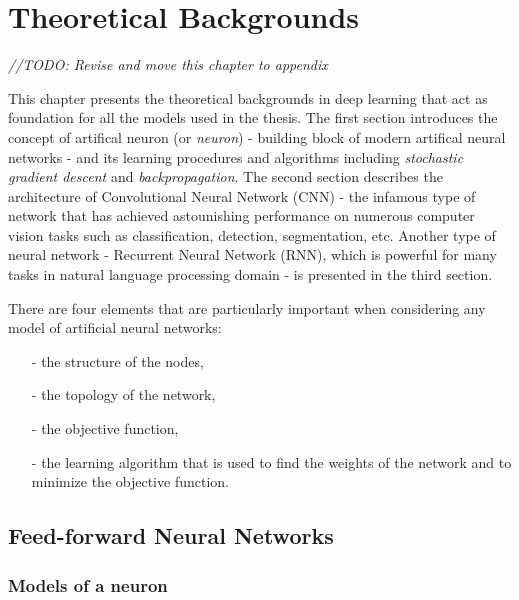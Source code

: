 \chapter{Theoretical Backgrounds}
\textit{//TODO: Revise and move this chapter to appendix}

\nocite{DBLP:journals/corr/Lipton15}

This chapter presents the theoretical backgrounds in deep learning that act as foundation for all the models used in the thesis.
The first section introduces the concept of artifical neuron (or \textit{neuron}) - building block of modern artifical neural networks - and its learning procedures and algorithms including \textit{stochastic gradient descent} and \textit{backpropagation}. The second section describes the architecture of Convolutional Neural Network (CNN) - the infamous type of network that has achieved astounishing performance on numerous computer vision tasks such as classification, detection, segmentation, etc. Another type of neural network - Recurrent Neural Network (RNN), which is powerful for many tasks in natural language processing domain - is presented in the third section. 

There are four elements that are particularly important when considering any model of artificial neural networks:
\begin{itemize}
	\item[-] the structure of the nodes,
	\item[-] the topology of the network,
	\item[-] the objective function,
	\item[-] the learning algorithm that is used to find the weights of the network and to minimize the objective function.
\end{itemize}
\section{Feed-forward Neural Networks}

\subsection{Models of a neuron}

